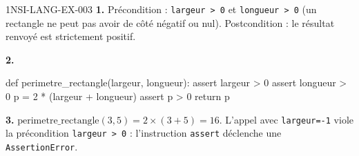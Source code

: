 \begin{corrige}{1NSI-LANG-EX-003}
\textbf{1.} Précondition : \lstinline{largeur > 0} et \lstinline{longueur > 0} (un
rectangle ne peut pas avoir de côté négatif ou nul). Postcondition : le résultat renvoyé est
strictement positif.

\textbf{2.}
\begin{python}
def perimetre_rectangle(largeur, longueur):
    assert largeur > 0
    assert longueur > 0
    p = 2 * (largeur + longueur)
    assert p > 0
    return p
\end{python}

\textbf{3.} $\text{perimetre\_rectangle}(3,5)=2\times(3+5)=16$. L'appel avec
\lstinline{largeur=-1} viole la précondition \lstinline{largeur > 0} : l'instruction
\lstinline{assert} déclenche une \lstinline{AssertionError}.
\end{corrige}
